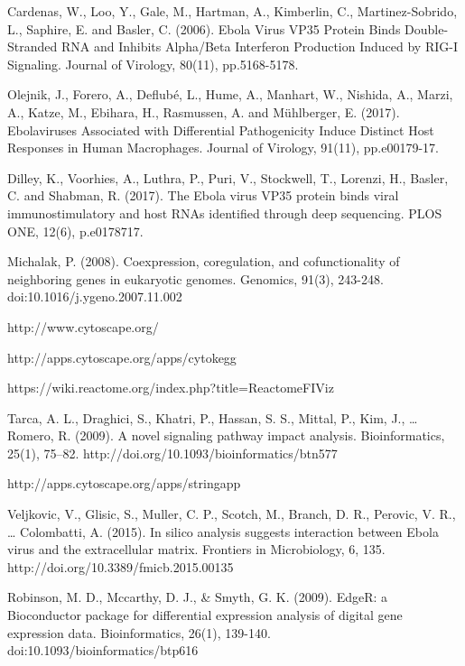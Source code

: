 \documentclass[twocolumn]{article}
\begin{document}
\begin{thebibliography}{9}
	Cardenas, W., Loo, Y., Gale, M., Hartman, A., Kimberlin, C., Martinez-Sobrido, L., Saphire, E. and Basler, C. (2006). Ebola Virus VP35 Protein Binds Double-Stranded RNA and Inhibits Alpha/Beta Interferon Production Induced by RIG-I Signaling. Journal of Virology, 80(11), pp.5168-5178.

	Olejnik, J., Forero, A., Deflubé, L., Hume, A., Manhart, W., Nishida, A., Marzi, A., Katze, M., Ebihara, H., Rasmussen, A. and Mühlberger, E. (2017). Ebolaviruses Associated with Differential Pathogenicity Induce Distinct Host Responses in Human Macrophages. Journal of Virology, 91(11), pp.e00179-17.

	Dilley, K., Voorhies, A., Luthra, P., Puri, V., Stockwell, T., Lorenzi, H., Basler, C. and Shabman, R. (2017). The Ebola virus VP35 protein binds viral immunostimulatory and host RNAs identified through deep sequencing. PLOS ONE, 12(6), p.e0178717.


	Michalak, P. (2008). Coexpression, coregulation, and cofunctionality of neighboring genes in eukaryotic genomes. Genomics, 91(3), 243-248. doi:10.1016/j.ygeno.2007.11.002

	http://www.cytoscape.org/

	http://apps.cytoscape.org/apps/cytokegg

	https://wiki.reactome.org/index.php?title=ReactomeFIViz

	Tarca, A. L., Draghici, S., Khatri, P., Hassan, S. S., Mittal, P., Kim, J., … Romero, R. (2009). A novel signaling pathway impact analysis. Bioinformatics, 25(1), 75–82. http://doi.org/10.1093/bioinformatics/btn577

	http://apps.cytoscape.org/apps/stringapp

	Veljkovic, V., Glisic, S., Muller, C. P., Scotch, M., Branch, D. R., Perovic, V. R., … Colombatti, A. (2015). In silico analysis suggests interaction between Ebola virus and the extracellular matrix. Frontiers in Microbiology, 6, 135. http://doi.org/10.3389/fmicb.2015.00135

	Robinson, M. D., Mccarthy, D. J., \& Smyth, G. K. (2009). EdgeR: a Bioconductor package for differential expression analysis of digital gene expression data. Bioinformatics, 26(1), 139-140. doi:10.1093/bioinformatics/btp616


\end{thebibliography}
\end{document}

